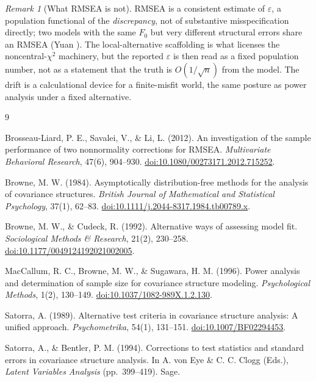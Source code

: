 \documentclass[11pt]{article}
\theoremstyle{plain}
\theoremstyle{remark}
\newtheorem*{remark}{Remark}
\begin{document}
\begin{remark}[What RMSEA is not]
RMSEA is a consistent estimate of $\varepsilon$, a population functional of the
\emph{discrepancy}, not of substantive misspecification directly; two models
with the same $F_0$ but very different structural errors share an RMSEA (Yuan
\cite{yuan2005}). The local-alternative scaffolding is what licenses the
noncentral-$\chi^2$ machinery, but the reported $\varepsilon$ is then read as a
fixed population number, not as a statement that the truth is $O(1/\sqrt n)$ from
the model. The drift is a calculational device for a finite-misfit world, the
same posture as power analysis under a fixed alternative.
\end{remark}

\begin{thebibliography}{9}

Brosseau-Liard, P. E., Savalei, V., \& Li, L. (2012).
An investigation of the sample performance of two nonnormality corrections for
RMSEA.
\emph{Multivariate Behavioral Research}, 47(6), 904--930.
\href{https://doi.org/10.1080/00273171.2012.715252}{doi:10.1080/00273171.2012.715252}.

Browne, M. W. (1984).
Asymptotically distribution-free methods for the analysis of covariance
structures.
\emph{British Journal of Mathematical and Statistical Psychology}, 37(1),
62--83.
\href{https://doi.org/10.1111/j.2044-8317.1984.tb00789.x}{doi:10.1111/j.2044-8317.1984.tb00789.x}.

Browne, M. W., \& Cudeck, R. (1992).
Alternative ways of assessing model fit.
\emph{Sociological Methods \& Research}, 21(2), 230--258.
\href{https://doi.org/10.1177/0049124192021002005}{doi:10.1177/0049124192021002005}.

MacCallum, R. C., Browne, M. W., \& Sugawara, H. M. (1996).
Power analysis and determination of sample size for covariance structure
modeling.
\emph{Psychological Methods}, 1(2), 130--149.
\href{https://doi.org/10.1037/1082-989X.1.2.130}{doi:10.1037/1082-989X.1.2.130}.

Satorra, A. (1989).
Alternative test criteria in covariance structure analysis: A unified approach.
\emph{Psychometrika}, 54(1), 131--151.
\href{https://doi.org/10.1007/BF02294453}{doi:10.1007/BF02294453}.

Satorra, A., \& Bentler, P. M. (1994).
Corrections to test statistics and standard errors in covariance structure
analysis. In A. von Eye \& C. C. Clogg (Eds.), \emph{Latent Variables Analysis}
(pp.\ 399--419). Sage.


\end{thebibliography}
\end{document}
